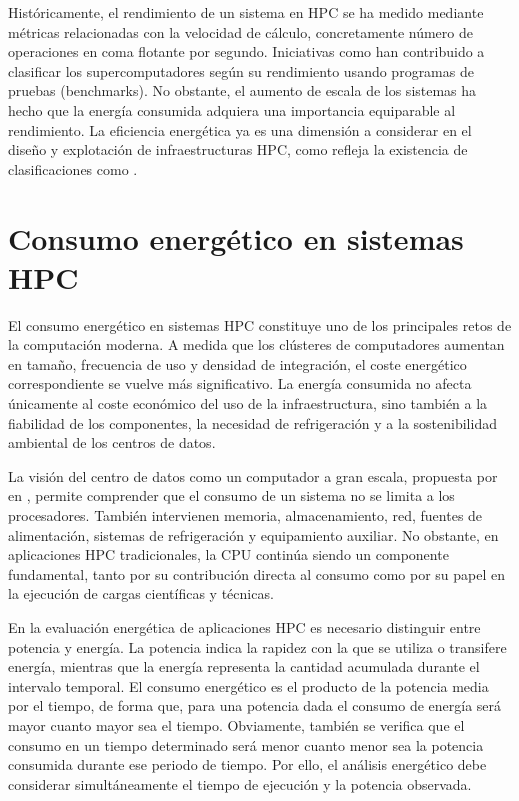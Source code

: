 Históricamente, el rendimiento de un sistema en HPC se ha medido mediante métricas relacionadas con la velocidad de cálculo, concretamente número de operaciones en coma flotante por segundo. Iniciativas como \textcite{top500} han contribuido a clasificar los supercomputadores según su rendimiento usando programas de pruebas (benchmarks). No obstante, el aumento de escala de los sistemas ha hecho que la energía consumida adquiera una importancia equiparable al rendimiento. La eficiencia energética ya es una dimensión a considerar en el diseño y explotación de infraestructuras HPC, como refleja la existencia de clasificaciones como \textcite{green500}.

\section{Consumo energético en sistemas HPC}

El consumo energético en sistemas HPC constituye uno de los principales retos de la computación moderna. A medida que los clústeres de computadores aumentan en tamaño, frecuencia de uso y densidad de integración, el coste energético correspondiente se vuelve más significativo. La energía consumida no afecta únicamente al coste económico del uso de la infraestructura, sino también a la fiabilidad de los componentes, la necesidad de refrigeración y a la sostenibilidad ambiental de los centros de datos.

La visión del centro de datos como un computador a gran escala, propuesta por \textcite{barroso2018datacenter} en \textit{}, permite comprender que el consumo de un sistema no se limita a los procesadores. También intervienen memoria, almacenamiento, red, fuentes de alimentación, sistemas de refrigeración y equipamiento auxiliar. No obstante, en aplicaciones HPC tradicionales, la CPU continúa siendo un componente fundamental, tanto por su contribución directa al consumo como por su papel en la ejecución de cargas científicas y técnicas.

En la evaluación energética de aplicaciones HPC es necesario distinguir entre potencia y energía. La potencia indica la rapidez con la que se utiliza o transifere energía, mientras que la energía representa la cantidad acumulada durante el intervalo temporal. El consumo energético es el producto de la potencia media por el tiempo, de forma que, para una potencia dada el consumo de energía será mayor cuanto mayor sea el tiempo. Obviamente, también se verifica que el consumo en un tiempo determinado será menor cuanto menor sea la potencia consumida durante ese periodo de tiempo. Por ello, el análisis energético debe considerar simultáneamente el tiempo de ejecución y la potencia observada.

